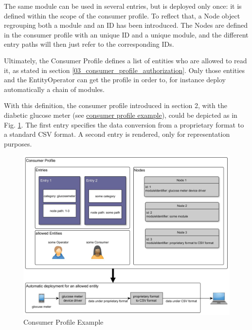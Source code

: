 The same module can be used in several entries, but is deployed only once: it is defined within the scope of the consumer profile. To reflect that, a Node object regrouping both a module and an ID has been introduced. The Nodes are defined in the consumer profile with an unique ID and a unique module, and the different entry paths will then just refer to the corresponding IDs. 

Ultimately, the Consumer Profile defines a list of entities who are allowed to read it, as stated in section \ref{03_consumer_profile_authorization}. Only those entities and the EntityOperator can get the profile in order to, for instance deploy automatically a chain of modules.

With this definition, the consumer profile introduced in section 2, with the diabetic glucose meter (see \hyperref[02_consumer_profile_example]{consumer profile example}), could be depicted as in Fig. \ref{fig:consumer_profile_example}. The first entry specifies the data conversion from a proprietary format to a standard CSV format. A second entry is rendered, only for representation purposes.\linebreak

\begin{figure}[!hpbt]
	\centering
	\caption{Consumer Profile Example}
	\label{fig:consumer_profile_example}
	\includegraphics[width=1\textwidth]{images/consumer_profile_example}
\end{figure}

